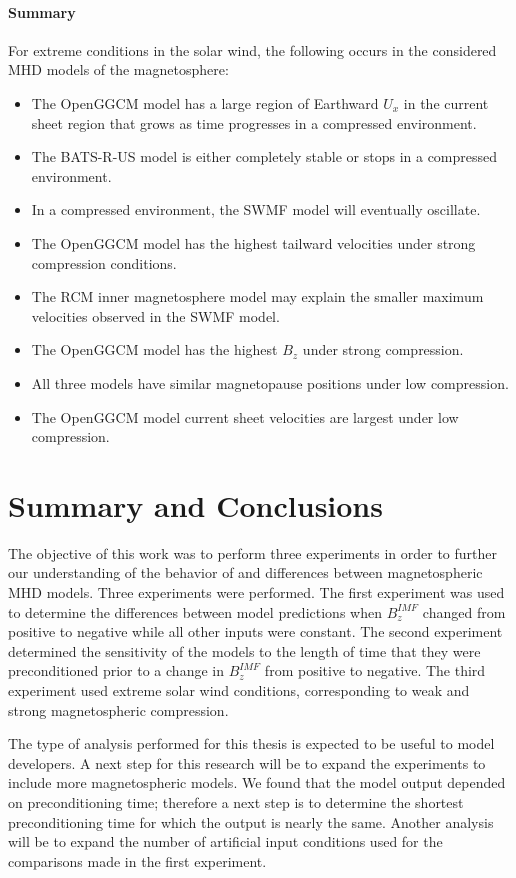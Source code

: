 \subsubsection{Summary}
For extreme conditions in the solar wind, the
following occurs in the considered MHD models of the magnetosphere:
\begin{itemize}
  \item The OpenGGCM model has a large region of Earthward $U_x$ in the current
  sheet region that grows as time progresses in a compressed environment.
  \item The BATS-R-US model is either completely stable or stops in a compressed
  environment.
  \item In a compressed environment, the SWMF model will eventually oscillate.
  \item The OpenGGCM model has the highest tailward velocities under strong compression conditions.
  \item The RCM inner magnetosphere model may explain the smaller maximum velocities observed in the SWMF model.
  \item The OpenGGCM model has the highest $B_z$ under strong compression.
  \item All three models have similar magnetopause positions under low compression.
  \item The OpenGGCM model current sheet velocities are largest under low compression.
\end{itemize}

\chapter{Summary and Conclusions}

The objective of this work was to perform three experiments in order to further
our understanding of the behavior of and differences between magnetospheric MHD
models. Three experiments were performed.  The first experiment was used to
determine the differences between model predictions when $B_z^{IMF}$ changed
from positive to negative while all other inputs were constant.  The second
experiment determined the sensitivity of the models to the length of time that
they were preconditioned prior to a change in $B_z^{IMF}$ from positive to
negative.  The third experiment used extreme solar wind conditions,
corresponding to weak and strong magnetospheric compression.

The type of analysis performed for this thesis is expected to be
useful to model developers. A next step for this research will be to
expand the experiments to include more magnetospheric models. We found
that the model output depended on preconditioning time; therefore a
next step is to determine the shortest preconditioning time for which
the output is nearly the same.  Another analysis will be to
expand the number of artificial input conditions used for the comparisons made in the first experiment. 

